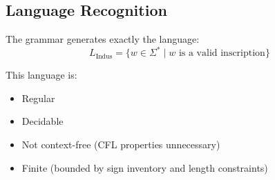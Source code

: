 \subsection{Language Recognition}

The grammar generates exactly the language:
\[
L_{\text{Indus}} = \{w \in \Sigma^* \mid w \text{ is a valid inscription}\}
\]

This language is:
\begin{itemize}
    \item Regular
    \item Decidable
    \item Not context-free (CFL properties unnecessary)
    \item Finite (bounded by sign inventory and length constraints)
\end{itemize}
